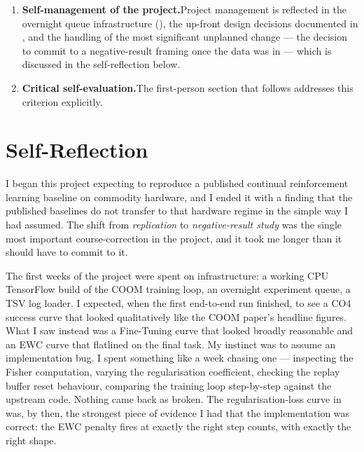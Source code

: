 \begin{enumerate}[label=\textbf{B\arabic*.},leftmargin=2.4em]
    \item \textbf{Self-management of the project.}\quad Project
        management is reflected in the overnight queue
        infrastructure (), the up-front design
        decisions documented in , and the
        handling of the most significant unplanned change ---
        the decision to commit to a negative-result framing
        once the data was in --- which is discussed in the
        self-reflection below.

    \item \textbf{Critical self-evaluation.}\quad The
        first-person section that follows addresses this
        criterion explicitly.
\end{enumerate}

\section{Self-Reflection}
\label{sec:reflection}

I began this project expecting to reproduce a published
continual reinforcement learning baseline on commodity
hardware, and I ended it with a finding that the published
baselines do not transfer to that hardware regime in the simple
way I had assumed. The shift from \emph{replication} to
\emph{negative-result study} was the single most important
course-correction in the project, and it took me longer than it
should have to commit to it.

The first weeks of the project were spent on infrastructure: a
working CPU TensorFlow build of the COOM training loop, an
overnight experiment queue, a TSV log loader. I expected, when
the first end-to-end run finished, to see a CO4 success curve
that looked qualitatively like the COOM paper's headline
figures. What I saw instead was a Fine-Tuning curve that
looked broadly reasonable and an EWC curve that flatlined on
the final task. My instinct was to assume an implementation
bug. I spent something like a week chasing one --- inspecting
the Fisher computation, varying the regularisation coefficient,
checking the replay buffer reset behaviour, comparing the
training loop step-by-step against the upstream code. Nothing
came back as broken. The regularisation-loss curve in
 was, by then, the strongest piece of
evidence I had that the implementation was correct: the EWC
penalty fires at exactly the right step counts, with exactly
the right shape.

